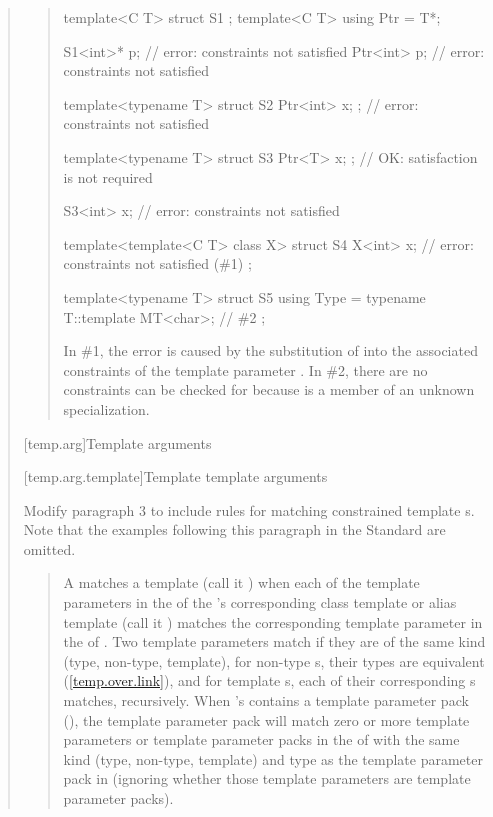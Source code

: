 \begin{quote}
\begin{quote}
\begin{codeblock}
template<C T> struct S1 { };
template<C T> using Ptr = T*;

S1<int>* p; // error: constraints not satisfied
Ptr<int> p; // error: constraints not satisfied

template<typename T>
  struct S2 { Ptr<int> x; }; // error: constraints not satisfied

template<typename T>
  struct S3 { Ptr<T> x; };   // OK: satisfaction is not required

S3<int> x;                   // error: constraints not satisfied

template<template<C T> class X>
  struct S4 {
    X<int> x; // error: constraints not satisfied (\#1)
  };

template<typename T>
  struct S5 {
    using Type = typename T::template MT<char>; // \#2
  };
\end{codeblock}
In \#1, the error is caused by the substitution of  into 
the associated constraints of the template parameter .
% 
In \#2, there are no constraints can be checked for 
 because  is a member
of an unknown specialization.
\exitexample
\end{quote}


[temp.arg]{Template arguments}

[temp.arg.template]{Template template arguments}

Modify paragraph 3 to include rules for matching constrained template 
s. Note that the examples following this 
paragraph in the \Cpp Standard are omitted.

\begin{quote}
\setcounter{Paras}{2}
\pnum
A  matches  a template 
  (call it ) when each of the 
template parameters in the  of the 
's corresponding class template or alias 
template (call it  ) matches the corresponding template parameter in 
the  of .
% 
Two template parameters match if they are of the same kind (type, non-type, 
template), for non-type s, their types are 
equivalent (\ref{temp.over.link}), and for template 
s, each of their corresponding
s matches, recursively. 
% 
When 's  
contains a template parameter pack (), the template 
parameter pack will match zero or more template parameters or template 
parameter packs in the  of
 with the same kind (type, non-type, template) and type as the template 
parameter pack in  (ignoring whether those template parameters are
template parameter packs).
\end{quote}


\end{quote}
